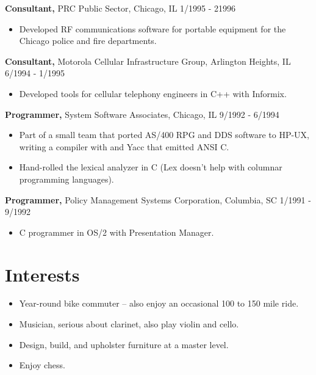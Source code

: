 \documentclass[margin]{res}
\begin{document}
\begin{resume}
{\bf Consultant,} PRC Public Sector, Chicago, IL \hfill 1/1995 - 21996
\begin{itemize} \itemsep -2pt 
\item Developed RF communications software for portable equipment for the Chicago police and fire departments.
\end{itemize}

{\bf Consultant,} Motorola Cellular Infrastructure Group, Arlington Heights, IL \hfill 6/1994 - 1/1995
\begin{itemize} \itemsep -2pt 
\item Developed tools for cellular telephony engineers in C++ with Informix.
\end{itemize}

{\bf Programmer,} System Software Associates, Chicago, IL \hfill 9/1992 - 6/1994
\begin{itemize} \itemsep -2pt 
\item Part of a small team that ported AS/400 RPG and DDS software to HP-UX, writing a compiler with and Yacc that emitted ANSI C.
\item Hand-rolled the lexical analyzer in C (Lex doesn't help with columnar programming languages).
\end{itemize}

{\bf Programmer,} Policy Management Systems Corporation, Columbia, SC \hfill 1/1991 - 9/1992
\begin{itemize} \itemsep -2pt 
\item C programmer in OS/2 with Presentation Manager.
\end{itemize}

\section{Interests}
\begin{itemize} \itemsep -2pt 
\item Year-round bike commuter -- also enjoy an occasional 100 to 150 mile ride.
\item Musician, serious about clarinet, also play violin and cello.
\item Design, build, and upholster furniture at a master level.
\item Enjoy chess.
\end{itemize}


\end{resume} 
\end{document}
